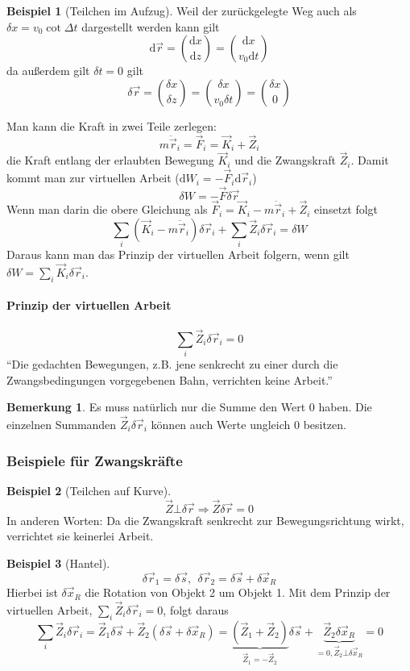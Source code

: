 \documentclass[oneside]{book}
\theoremstyle{definition}
\newtheorem*{bemerkung*}{Bemerkung}
\newtheorem*{beispiel*}{Beispiel}
\renewcommand{\d}{\mathrm d}
\newcommand{\rvec}{\vec{r}}
\newcommand{\ddotvec}[1]{\ddot{\vec{#1}}}
\begin{document}
\begin{beispiel*}[Teilchen im Aufzug]
Weil der zurückgelegte Weg auch als $\delta x = v_0 \cot \Delta t$ dargestellt werden kann gilt
$$\d \vec{r} = \binom{\d x}{\d z} = \binom{\d x}{ v_0 \d t}$$
da außerdem gilt $\delta t = 0$ gilt
$$\delta \vec{r} = \binom{\delta x}{\delta z} = \binom{\delta x}{v_0 \delta t} = \binom{\delta x}{0}$$
\end{beispiel*}
Man kann die Kraft in zwei Teile zerlegen:
$$m \ddotvec{r}_i = \vec{F}_i = \vec{K}_i + \vec{Z}_i$$
die Kraft entlang der erlaubten Bewegung $\vec{K}_i$ und die Zwangskraft $\vec{Z}_i$. Damit kommt man zur virtuellen Arbeit ($\d W_i = - \vec{F}_i \d \vec{r}_i$)
$$\delta W = - \vec{F} \delta \vec{r}$$
Wenn man darin die obere Gleichung als $\vec{F}_i = \vec{K}_i - m \ddotvec{r}_i + \vec{Z}_i$ einsetzt folgt
$$\sum_i (\vec{K}_i - m \ddot{\vec{r}}_i) \delta \vec{r}_i + \sum_i \vec{Z}_i \delta \vec{r}_i = \delta W$$
Daraus kann man das Prinzip der virtuellen Arbeit folgern, wenn gilt $\delta W = \sum_i \vec{K}_i \delta \rvec_i$.

\paragraph{Prinzip der virtuellen Arbeit}
$$\sum_i \vec{Z}_i \delta \vec{r}_i = 0$$
"`Die gedachten Bewegungen, z.B. jene senkrecht zu einer durch die Zwangsbedingungen vorgegebenen Bahn, verrichten keine Arbeit."'

\begin{bemerkung*}
	Es muss natürlich nur die Summe den Wert 0 haben. Die einzelnen Summanden $\vec{Z}_i \delta \rvec_i$ können auch Werte ungleich 0 besitzen.
\end{bemerkung*}

\subsubsection{Beispiele für Zwangskräfte}

\begin{beispiel*}[Teilchen auf Kurve]
$$\vec{Z} \bot \delta \vec{r} \Rightarrow \vec{Z} \delta \vec{r} = 0$$
In anderen Worten: Da die Zwangskraft senkrecht zur Bewegungsrichtung wirkt, verrichtet sie keinerlei Arbeit. 
\end{beispiel*}

\begin{beispiel*}[Hantel]
$$\delta \vec{r}_1 = \delta\vec{s},~~ \delta \vec{r}_2 = \delta \vec{s} + \delta \vec{x}_R$$
Hierbei ist $\delta \vec{x}_R$ die Rotation von Objekt 2 um Objekt 1.
Mit dem Prinzip der virtuellen Arbeit, $\sum_i \vec{Z}_i \delta \vec{r}_i = 0$, folgt daraus
$$\sum_i \vec Z_i \delta \vec{r}_i = \vec{Z}_1 \delta \vec{s} + \vec{Z}_2 (\delta \vec{s} + \delta \vec{x}_R) 
= \underbrace{(\vec{Z}_1 + \vec{Z}_2)}_{\vec{Z}_1 = - \vec{Z}_2} \delta \vec{s} + \underbrace{\vec{Z}_2 \delta \vec{x}_R}_{= 0, \vec{Z}_2 \bot \delta \vec{x}_R} = 0$$
\end{beispiel*}
\end{document}
